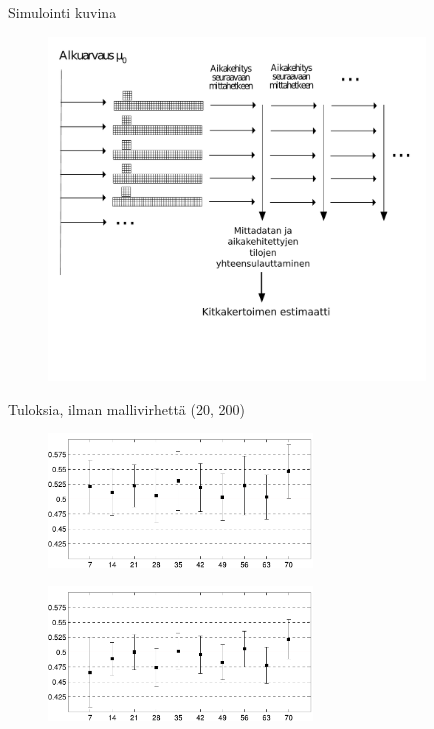 \documentclass{beamer}
\begin{document}
\begin{frame}{Simulointi kuvina}

\begin{figure}
\includegraphics[width=10cm]{alkukokoelma2.pdf}
\end{figure}

\end{frame}

\begin{frame}{Tuloksia, ilman mallivirhettä (20, 200)}

\begin{figure}
\includegraphics[width=7cm]{xxx_20_no_model_error.pdf}
\end{figure}

\begin{figure}
\includegraphics[width=7cm]{xxx_200_no_model_error.pdf}
\end{figure}

\end{frame}
\end{document}
